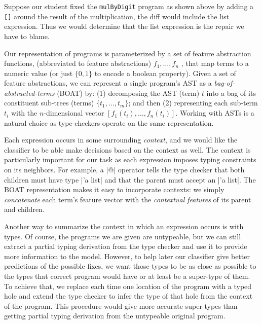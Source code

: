  Suppose our student fixed the \texttt{mulByDigit} program as shown above by adding a \texttt{[]}
around the result of the multiplication, the diff would include the list expression. Thus we would determine that the
list expression is the repair we have to blame.

 Our representation of programs is parameterized by a set of feature abstraction
functions, (abbreviated to feature abstractions) $f_1, \ldots, f_n$ , that map terms to a numeric value (or just $\{0,
1\}$ to encode a boolean property). Given a set of feature abstractions, we can represent a single program’s AST as a
\emph{bag-of-abstracted-terms} (BOAT) by:
%
(1) decomposing the AST (term) $t$ into a bag of its constituent sub-trees (terms) $\{t_1, \ldots, t_m\}$; and then
%
(2) representing each sub-term $t_i$ with the $n$-dimensional vector $[f_1(t_i), \ldots, f_n(t_i)]$. Working with ASTs
is a natural choice as type-checkers operate on the same representation.

 Each expression occurs in some surrounding \emph{context}, and we would like the classifier
to be able make decisions based on the context as well. The context is particularly important for our task as each
expression imposes typing constraints on its neighbors. For example, a |@| operator tells the type checker that both
children must have type |'a list| and that the parent must accept an |'a list|. The BOAT representation makes it easy to
incorporate contexts: we simply \emph{concatenate} each term’s feature vector with the \emph{contextual features} of its
parent and children.

 Another way to summarize the context in which an expression occurs is with types. Of course, the
programs we are given are untypeable, but we can still extract a partial typing derivation from the type checker and use
it to provide more information to the model. However, to help later our classifier give better predictions of the
possible fixes, we want those types to be as close as possible to the types that correct program would have or at least
be a super-type of them. To achieve that, we replace each time one location of the program with a typed hole and extend
the type checker to infer the type of that hole from the context of the program. This procedure would give more accurate
super-types than getting partial typing derivation from the untypeable original program.



